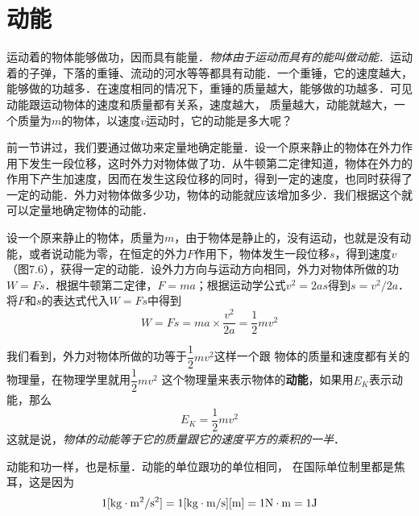 \section{动能}
运动着的物体能够做功，因而具有能量．\textit{物体由于运动而具有的能叫做动能}．运动着的子弹，下落的重锤、流动的河水等等都具有动能．一个重锤，它的速度越大，能够做的功越多．在速度相同的情况下，重锤的质量越大，能够做的功越多．可见动能跟运动物体的速度和质量都有关系，速度越大，
质量越大，动能就越大，一个质量为$m$的物体，以速度$v$运动时，它的动能是多大呢？
	
前一节讲过，我们要通过做功来定量地确定能量．设一个原来静止的物体在外力作用下发生一段位移，这时外力对物体做了功．从牛顿第二定律知道，物体在外力的作用下产生加速度，因而在发生这段位移的同时，得到一定的速度，也同时获得了一定的动能．外力对物体做多少功，物体的动能就应该增加多少．我们根据这个就可以定量地确定物体的动能．

\begin{figure}[htp]
\centering
{}
\caption{}
\end{figure}

设一个原来静止的物体，质量为$m$，由于物体是静止的，没有运动，也就是没有动能，或者说动能为零，在恒定的外力$F$作用下，物体发生一段位移$s$，得到速度$v$（图7.6），获得一定的动能．设外力方向与运动方向相同，外力对物体所做的功$W=Fs$．根据牛顿第二定律，$F=ma$；根据运动学公式$v^2=2as$得到$s=v^2/2a$．将$F$和$s$的表达式代入$W=Fs$中得到
\[W=Fs=ma\times \frac{v^2}{2a}=\frac{1}{2}mv^2 \]

我们看到，外力对物体所做的功等于$\dfrac{1}{2}mv^2$这样一个跟
物体的质量和速度都有关的物理量，在物理学里就用$\dfrac{1}{2}mv^2$
这个物理量来表示物体的\textbf{动能}，如果用$E_K$表示动能，那么	
\[E_K=\frac{1}{2}mv^2 \]
这就是说，\textit{物体的动能等于它的质量跟它的速度平方的乘积的一半}．

动能和功一样，也是标量．动能的单位跟功的单位相同，
在国际单位制里都是焦耳，这是因为
\[1[{\rm kg}\cdot {\rm m^2}/{\rm s^2}]=1[{\rm kg}\cdot \text{m}/\text{s}][{\rm m}]=1{\rm N}\cdot {\rm m}=1{\rm J}\]


